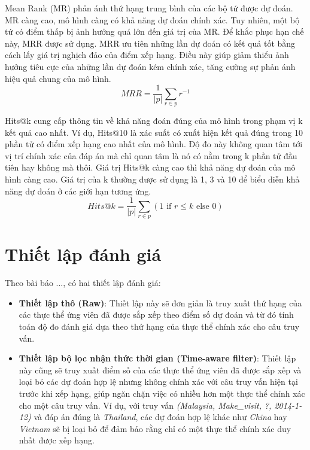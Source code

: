 Mean Rank (MR) phản ánh thứ hạng trung bình của các bộ tứ được dự đoán. MR càng cao, mô hình càng có khả năng dự đoán chính xác. Tuy
nhiên, một bộ tứ có điểm thấp bị ảnh hưởng quá lớn đến giá trị của MR. Để khắc phục hạn chế này, MRR được sử dụng. MRR ưu tiên những lần 
dự đoán có kết quả tốt bằng cách lấy giá trị nghịch đảo của điểm xếp hạng. Điều này giúp giảm thiểu ảnh hưởng tiêu cực của những lần dự đoán kém 
chính xác, tăng cường sự phản ánh hiệu quả chung của mô hình.
\begin{equation}
    \label{eq:MRR}
    MRR = \frac{1}{|p|} \sum_{r \in p} r^{-1}
\end{equation}

Hits@k cung cấp thông tin về khả năng đoán đúng của mô hình trong phạm vị k kết quả cao nhất. Ví dụ, Hits@10 là xác suất có xuất hiện kết quả đúng trong 10 phần tử có điểm xếp hạng cao nhất của mô hình. Độ đo này không quan tâm tới vị trí chính xác của đáp án mà chỉ quan tâm là nó có nằm trong k phần tử đầu tiên hay không mà thôi. Giá trị Hits@k càng cao thì khả năng dự đoán của mô hình càng cao. Giá trị của k thường được sử dụng là 1, 3 và 10 để biểu diễn khả năng dự đoán ở các giới hạn tương ứng.
\begin{equation}
    \label{eq:hit@k}
    Hits@k = \frac{1}{|p|} \sum_{r \in p} (1 \text{ if } r \leq k \text{ else } 0)
    \tag{x}
\end{equation}

\section{Thiết lập đánh giá}

Theo bài báo ..., có hai thiết lập đánh giá:
\begin{itemize}
    \item \textbf{Thiết lập thô (Raw)}: Thiết lập này sẽ đơn giản là truy xuất thứ hạng của các thực thể ứng viên đã được sắp xếp theo điểm số
    dự đoán và từ đó tính toán độ đo đánh giá dựa theo thứ hạng của thực thể chính xác cho câu truy vấn. 
    \item \textbf{Thiết lập bộ lọc nhận thức thời gian (Time-aware filter)}: Thiết lập này cũng sẽ truy xuất điểm số của các thực thể ứng viên đã được sắp xếp 
    và loại bỏ các dự đoán hợp lệ nhưng không chính xác với câu truy vấn hiện tại trước khi xếp hạng, giúp ngăn chặn việc có nhiều hơn một thực thể chính xác cho một câu truy vấn.
    Ví dụ, với truy vấn \textit{(Malaysia, Make\_visit, ?, 2014-1-12)} và đáp án đúng là \textit{Thailand}, các dự đoán hợp lệ khác như 
    \textit{China} hay \textit{Vietnam} sẽ bị loại bỏ để đảm bảo rằng chỉ có một thực thể chính xác duy nhất được xếp hạng.
\end{itemize}

